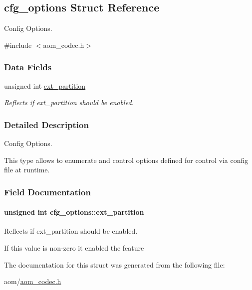 \hypertarget{structcfg__options}{}\subsection{cfg\+\_\+options Struct Reference}
\label{structcfg__options}


Config Options.  




{\ttfamily \#include $<$aom\+\_\+codec.\+h$>$}

\subsubsection*{Data Fields}
\begin{DoxyCompactItemize}
\item 
unsigned int \hyperlink{structcfg__options_a182a68d20ce40143d34cfbc385c353b6}{ext\+\_\+partition}
\begin{DoxyCompactList}\small\item\em Reflects if ext\+\_\+partition should be enabled. \end{DoxyCompactList}\end{DoxyCompactItemize}


\subsubsection{Detailed Description}
Config Options. 

This type allows to enumerate and control options defined for control via config file at runtime. 

\subsubsection{Field Documentation}
\paragraph[{\texorpdfstring{ext\+\_\+partition}{ext_partition}}]{\setlength{\rightskip}{0pt plus 5cm}unsigned int cfg\+\_\+options\+::ext\+\_\+partition}\hypertarget{structcfg__options_a182a68d20ce40143d34cfbc385c353b6}{}\label{structcfg__options_a182a68d20ce40143d34cfbc385c353b6}


Reflects if ext\+\_\+partition should be enabled. 

If this value is non-\/zero it enabled the feature 

The documentation for this struct was generated from the following file\+:\begin{DoxyCompactItemize}
\item 
aom/\hyperlink{aom__codec_8h}{aom\+\_\+codec.\+h}\end{DoxyCompactItemize}
